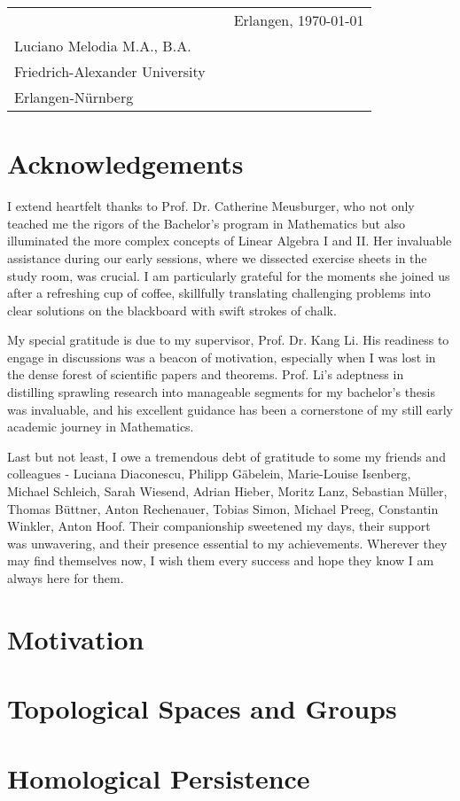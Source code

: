 \documentclass[b5paper, 12pt, twoside]{report}
\begin{document}
	\vspace{2cm}
	\begin{tabular}{@{}p{3.5in}p{2in}p{2in}@{}}
		\hrulefill                    &  & Erlangen, \today \\
		Luciano Melodia M.A., B.A.    &  &                  \\
		Friedrich-Alexander University \\
		Erlangen-Nürnberg
	\end{tabular}

	\chapter*{Acknowledgements}

	I extend heartfelt thanks to Prof. Dr. Catherine Meusburger, who not only teached
	me the rigors of the Bachelor's program in Mathematics but also illuminated the
	more complex concepts of Linear Algebra I and II. Her invaluable assistance
	during our early sessions, where we dissected exercise sheets in the study room,
	was crucial. I am particularly grateful for the moments she joined us after a refreshing
	cup of coffee, skillfully translating challenging problems into clear
	solutions on the blackboard with swift strokes of chalk.

	My special gratitude is due to my supervisor, Prof. Dr. Kang Li. His readiness
	to engage in discussions was a beacon of motivation, especially when I was lost
	in the dense forest of scientific papers and theorems. Prof. Li's adeptness in
	distilling sprawling research into manageable segments for my bachelor's thesis
	was invaluable, and his excellent guidance has been a cornerstone of my still
	early academic journey in Mathematics.

	Last but not least, I owe a tremendous debt of gratitude to some my friends and colleagues - Luciana
	Diaconescu, Philipp Gäbelein, Marie-Louise Isenberg, Michael Schleich, Sarah Wiesend,
	Adrian Hieber, Moritz Lanz, Sebastian Müller, Thomas Büttner, Anton Rechenauer, Tobias Simon, Michael Preeg, Constantin Winkler, Anton Hoof. Their companionship sweetened my days, their support was unwavering, and their presence essential to my achievements. Wherever they may find themselves now, I wish them every success and hope they know I am always here for them.

	\newpage
	\tableofcontents

	\singlespacing
	\chapter{Motivation}
	

	\chapter{Topological Spaces and Groups}
	

	\chapter{Homological Persistence}
	

	\singlespacing
	\printbibliography

	\newpage
	\printindex
\end{document}
